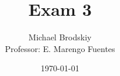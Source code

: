 


\title{Exam 3}
\date{\today}
\author{Michael Brodskiy\\ \small Professor: E. Marengo Fuentes}



\maketitle

